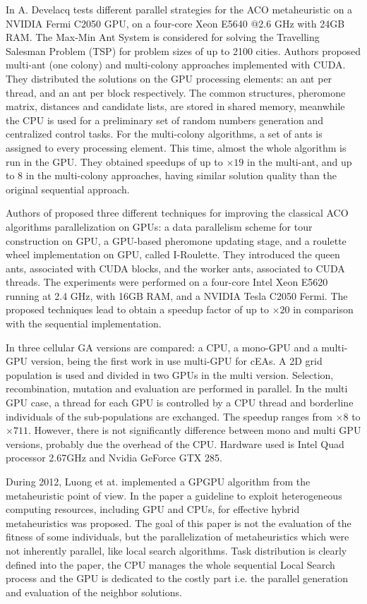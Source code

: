 \documentclass[review]{elsarticle}
\begin{document}
In \cite{ACO-on-GPU_Develacq} A. Develacq tests different parallel strategies for the ACO metaheuristic on a NVIDIA Fermi C2050 GPU, on a four-core Xeon E5640 @2.6 GHz with 24GB RAM. The Max-Min Ant System is considered for solving the Travelling Salesman Problem (TSP) for problem sizes of up to 2100 cities. Authors proposed multi-ant (one colony) and multi-colony approaches implemented with CUDA. They distributed the solutions on the GPU processing elements: an ant per thread, and an ant per block respectively. The common structures, pheromone matrix, distances and candidate lists, are stored in shared memory, meanwhile the CPU is used for a preliminary set of random numbers generation and centralized control tasks. For the multi-colony algorithms, a set of ants is assigned to every processing element. This time, almost the whole algorithm is run in the GPU. They obtained speedups of up to $\times19$ in the multi-ant, and up to 8 in the multi-colony approaches, having similar solution quality than the original sequential approach.

Authors of \cite{Cecilia201342} proposed three different techniques for improving the classical ACO algorithms parallelization on GPUs: a data parallelism scheme for tour construction on GPU, a GPU-based pheromone updating stage, and a roulette wheel implementation on GPU, called I-Roulette. They introduced the queen ants, associated with CUDA blocks, and the worker ants, associated to CUDA threads. The experiments were performed on a four-core Intel Xeon E5620 running at 2.4 GHz, with 16GB RAM, and a NVIDIA Tesla C2050 Fermi. The proposed techniques lead to obtain a speedup factor of up to $\times20$ in comparison with the sequential implementation.

In \cite{5586530} three cellular GA versions are compared: a CPU, a mono-GPU and a multi-GPU version, being the first work in use multi-GPU for cEAs. A 2D grid population is used and divided in two GPUs in the multi version. Selection, recombination, mutation and evaluation are performed in parallel. In the multi GPU case, a thread for each GPU is controlled by a CPU thread and borderline individuals of the sub-populations are exchanged. The speedup ranges from $\times8$ to $\times711$. However, there is not significantly difference between mono and multi GPU versions, probably due the overhead of the CPU. Hardware used is Intel Quad processor 2.67GHz and Nvidia GeForce GTX 285.



During 2012, Luong et at. \cite{luongMetaheuristicsPpsn2012} implemented a GPGPU algorithm from the metaheuristic point of view. In the paper a guideline to exploit heterogeneous computing resources, including GPU and CPUs, for effective hybrid metaheuristics was proposed. The goal of this paper is not the evaluation of the fitness of some individuals, but the parallelization of metaheuristics which were not inherently parallel, like local search algorithms. Task distribution is clearly defined into the paper, the CPU manages the whole sequential Local Search process and the GPU is dedicated to the costly part i.e. the parallel generation and evaluation of the neighbor solutions.
\end{document}
